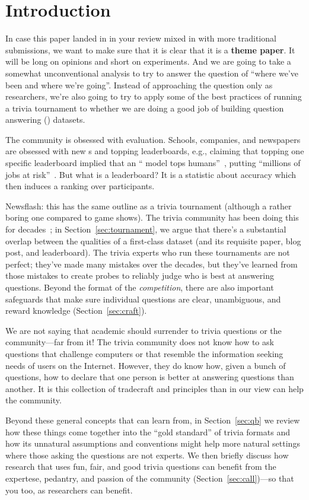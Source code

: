 

\section{Introduction}


In case this paper landed in in your review mixed in with more traditional  submissions, we want to make sure that it is clear that it is a {\bf theme paper}.
It will be long on opinions and short on experiments.
And we are going to take a somewhat unconventional analysis to try to answer the question of ``where we've been and where we're going''.
Instead of approaching the question only as  researchers, we're also going to try to apply some of the best practices of running a trivia tournament to whether we are doing a good job of building question answering () datasets.

The \qa{} community is obsessed with evaluation.
Schools, companies, and newspapers are obsessed with new s and
topping leaderboards, e.g., claiming that topping one specific leaderboard implied that an `` model tops humans''~\citep{najberg-18}, putting ``millions of jobs at risk''~\cite{cuthbertson-18}.
But what is a leaderboard? 
It is a statistic about \qa{} accuracy which then induces a ranking over participants.

Newsflash: this has the same outline as a trivia tournament (although a rather boring one compared to game shows).  
The trivia community has been doing this for decades~\cite{jennings-06}; in
Section~\ref{sec:tournament}, we argue that there's a substantial
overlap between the qualities of a first-class  dataset (and
its requisite paper, blog post, and leaderboard).
The trivia experts who run these tournaments are not perfect; they've
made many mistakes over the decades, but they've learned from those
mistakes to create probes to reliably judge who is best at answering
questions.
Beyond the format of the \emph{competition}, there are also important
safeguards that make sure individual questions are clear, unambiguous,
and reward knowledge (Section~\ref{sec:craft}).

We are not saying that academic  should surrender to trivia questions or the community---far from it!
The trivia community does not know how to ask questions that challenge computers or that resemble the information seeking needs of users on the Internet.
However, they do know how, given a bunch of questions, how to declare that one person is better at answering questions than another.
It is this collection of tradecraft and principles than in our view can help the  community.

Beyond these general concepts that  can learn from, in
Section~\ref{sec:qb} we review how these things come together into the ``gold standard'' of trivia formats and how its unnatural assumptions and conventions might help more natural  settings where those asking the questions are not experts.
We then briefly discuss how research that uses fun, fair, and good
trivia questions can benefit from the expertese, pedantry, and passion
of the community (Section~\ref{sec:call})---so that you too, as
researchers can benefit.